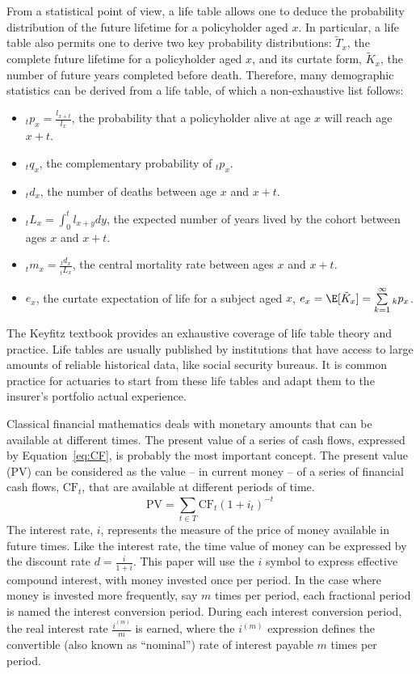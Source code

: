 \documentclass[nojss]{jss}
\begin{document}
From a statistical point of view, a life table allows one to deduce
the probability distribution of the future lifetime for a policyholder
aged $x$. In particular, a life table also permits one to derive two
key probability distributions: $\tilde T_x$, the complete future
lifetime for a policyholder aged $x$, and its curtate form, $\tilde
K_x$, the number of future years completed before death. Therefore,
many demographic statistics can be derived from a life table, of which
a non-exhaustive list follows:
\begin{itemize}
\item $_t{p_x} = \frac{l_{x + t}}{l_x}$, the probability that a policyholder
  alive at age $x$ will reach age $x+t$.
\item $_t{q_x}$, the complementary probability of $_t{p_x}$.
\item $_t{d_x}$, the number of deaths between age $x$ and $x+t$.
\item $_t{L_x} = \int_0^t {l_{x + y}}dy$, the expected number of years
  lived by the cohort between ages $x$ and $x+t$.
\item $_t{m_x} = \frac{{_t{d_x}}}{{_t{L_x}}}$, the central mortality
  rate between ages $x$ and $x+t$.
\item $e_x$, the curtate expectation of life for a subject aged $x$,
  $e_x = \E[ \tilde K_x] = \sum\limits_{k = 1}^\infty
  {_k{p_x}} $.
\end{itemize}

The Keyfitz textbook \citep{keyfitz2005applied} provides an exhaustive
coverage of life table theory and practice. Life tables are usually
published by institutions that have access to large amounts of
reliable historical data, like social security bureaus. It is common
practice for actuaries to start from these life tables and adapt them
to the insurer's portfolio actual experience.

Classical financial mathematics deals with monetary amounts that can
be available at different times. The present value of a series of cash
flows, expressed by Equation~\ref{eq:CF}, is probably the most
important concept. The present value (PV) can be considered as the
value -- in current money -- of a series of financial cash flows,
$\text{CF}_t$, that are available at different periods of time.
%
\begin{equation}
  \text{PV} = \sum\limits_{t \in T}^{} \text{CF}_{t} {\left( 1 + i_t \right)^{-t}}
  \label{eq:CF}
\end{equation}
%
The interest rate, $i$, represents the measure of the price of money
available in future times. Like the interest rate, the time value of
money can be expressed by the discount rate $d = \frac{i}{1 +
  i}$. This paper will use the $i$ symbol to express effective
compound interest, with money invested once per period. In the case
where money is invested more frequently, say $m$ times per period,
each fractional period is named the interest conversion period. During
each interest conversion period, the real interest rate
$\frac{i^{\left( m \right)}}{m}$ is earned, where the $i^{\left( m
  \right)}$ expression defines the convertible (also known as
``nominal'') rate of interest payable $m$ times per period.
\end{document}
